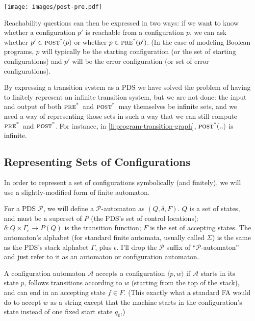 \documentclass{article}
\newcommand{\Config}[2]{\ensuremath{\langle #1, #2 \rangle}}
\newcommand{\powerset}[1]{P(#1)}
\newcommand{\poststar}{\ensuremath{\textsc{post}^\textsc{*}}}
\newcommand{\prestar}{\ensuremath{\textsc{pre}^\textsc{*}}}
\begin{document}
\begin{center}
  \texttt{[image: images/post-pre.pdf]}
\end{center}

Reachability questions can then be expressed in two ways: if we want
to know whether a configuration $p'$ is reachable from a configuration
$p$, we can ask whether $p' \in \poststar(p)$ or whether $p \in
\prestar(p')$. (In the case of modeling Boolean programs, $p$ will
typically be the starting configuration (or the set of starting
configurations) and $p'$ will be the error configuration (or set of
error configurations).

By expressing a transition system as a PDS we have solved the problem
of having to finitely represent an infinite transition system, but we
are not done: the input and output of both \prestar\ and
\poststar\ may themselves be infinite sets, and we need a way of
representing those sets in such a way that we can still compute
\prestar\ and \poststar. For instance, in
\cref{fi:program-transition-graph}, $\poststar(..)$ is infinite.

\subsection{Representing Sets of Configurations}

In order to represent a set of configurations symbolically (and
finitely), we will use a slightly-modified form of finite
automaton.

For a PDS $\mathcal{P}$, we will define a $\mathcal{P}$-automaton as
$(Q, \delta, F)$. $Q$ is a set of states, and must be a superset of
$P$ (the PDS's set of control locations); $\delta: Q \times
\Gamma_\epsilon \rightarrow \powerset{Q}$ is the transition function;
$F$ is the set of accepting states. The automaton's alphabet (for
standard finite automata, usually called $\Sigma$) is the same as the
PDS's stack alphabet $\Gamma$, plus $\epsilon$. I'll drop the
$\mathcal{P}$ suffix of ``$\mathcal{P}$-automaton'' and just refer to
it as an automaton or configuration automaton.

A configuration automaton $\mathcal{A}$ accepts a configuration
\Config{p}{w} if $\mathcal{A}$ starts in its state $p$, follows
transitions according to $w$ (starting from the top of the stack), and
can end in an accepting state $f \in F$. (This exactly what a standard
FA would do to accept $w$ as a string except that the machine starts
in the configuration's state instead of one fixed start state $q_0$,)
\end{document}

